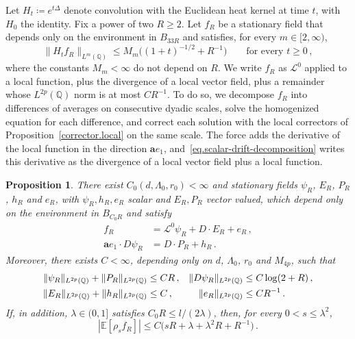 \documentclass[11pt]{amsart}
\newtheorem{proposition}{Proposition}[section]
\theoremstyle{definition}
\theoremstyle{remark}
\numberwithin{equation}{section}
\newcommand{\E}{\mathbb E}
\newcommand{\Q}{\mathbb Q}
\renewcommand{\a}{\mathbf a}
\begin{document}
Let $H_t\coloneqq e^{t\Delta}$ denote convolution with the Euclidean heat kernel at time $t$, with $H_0$ the identity. Fix a power of two $R\geq2$. Let $f_R$ be a stationary field that depends only on the environment in $B_{33R}$ and satisfies, for every $m\in[2,\infty)$,
\begin{equation}\label{eq.scalar-averaging-assumption}
 \|H_tf_R\|_{L^m(\Q)}\leq M_m\big((1+t)^{-1/2}+R^{-1}\big)
 \qquad\text{for every }t\geq0\, ,
\end{equation}
where the constants $M_m<\infty$ do not depend on $R$. We write $f_R$ as $\mathcal L^0$ applied to a local function, plus the divergence of a local vector field, plus a remainder whose $L^{2p}(\Q)$ norm is at most $CR^{-1}$. To do so, we decompose $f_R$ into differences of averages on consecutive dyadic scales, solve the homogenized equation for each difference, and correct each solution with the local correctors of Proposition~\ref{corrector.local} on the same scale. The force adds the derivative of the local function in the direction $\a e_1$, and~\eqref{eq.scalar-drift-decomposition} writes this derivative as the divergence of a local vector field plus a local function.

\begin{proposition}\label{scalar.decomposition}
There exist $C_0(d,\Lambda_0,r_0)<\infty$ and stationary fields $\psi_R$, $E_R$, $P_R$, $h_R$ and $e_R$, with $\psi_R,h_R,e_R$ scalar and $E_R,P_R$ vector valued, which depend only on the environment in $B_{C_0R}$ and satisfy
\begin{align}
 f_R&=\mathcal L^0\psi_R+D\cdot E_R+e_R\, ,\label{eq.scalar-decomposition}\\
 \a e_1\cdot D\psi_R&=D\cdot P_R+h_R\, .\label{eq.scalar-drift-decomposition}
\end{align}
Moreover, there exists $C<\infty$, depending only on $d$, $\Lambda_0$, $r_0$ and $M_{4p}$, such that
\begin{align}
 \|\psi_R\|_{L^{2p}(\Q)}+\|P_R\|_{L^{2p}(\Q)}&\leq CR\, ,
 &\|D\psi_R\|_{L^{2p}(\Q)}&\leq C\log(2+R)\, ,\notag\\
 \|E_R\|_{L^{2p}(\Q)}+\|h_R\|_{L^{2p}(\Q)}&\leq C\, ,
 &\|e_R\|_{L^{2p}(\Q)}&\leq CR^{-1}\, .
 \label{eq.scalar-decomposition-bounds}
\end{align}
If, in addition, $\lambda\in(0,1]$ satisfies $C_0R\leq l/(2\lambda)$, then, for every $0<s\leq\lambda^2$,
\begin{equation}\label{eq.scalar-response}
 |\E[\rho_sf_R]|
 \leq C\big(sR+\lambda+\lambda^2R+R^{-1}\big)\, .
\end{equation}
\end{proposition}
\end{document}
